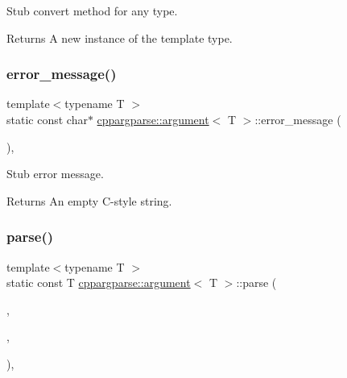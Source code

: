 Stub convert method for any type. 

\begin{DoxyReturn}{Returns}
A new instance of the template type. 
\end{DoxyReturn}
\mbox{\label{structcppargparse_1_1argument_a40c742ace10b7eeb56f2e49429f9be33}} 
\subsubsection{\texorpdfstring{error\+\_\+message()}{error\_message()}}
{\footnotesize\ttfamily template$<$typename T $>$ \\
static const char$\ast$ \hyperlink{structcppargparse_1_1argument}{cppargparse\+::argument}$<$ T $>$\+::error\+\_\+message (\begin{DoxyParamCaption}\item[{const \hyperlink{types_8h_a43b4f43f8940de1bf09ced6f1b668053}{types\+::\+Command\+Line\+Position\+\_\+t} \&}]{ }\end{DoxyParamCaption})\hspace{0.3cm}{\ttfamily [inline]}, {\ttfamily [static]}}



Stub error message. 

\begin{DoxyReturn}{Returns}
An empty C-\/style string. 
\end{DoxyReturn}
\mbox{\label{structcppargparse_1_1argument_a9b5feac6fe8cf18beb63d85c0840cd84}} 
\subsubsection{\texorpdfstring{parse()}{parse()}}
{\footnotesize\ttfamily template$<$typename T $>$ \\
static const T \hyperlink{structcppargparse_1_1argument}{cppargparse\+::argument}$<$ T $>$\+::parse (\begin{DoxyParamCaption}\item[{const \hyperlink{types_8h_a80adf2418b7ce9fe616698efa7533ecf}{types\+::\+Command\+Line\+\_\+t} \&}]{,  }\item[{const \hyperlink{types_8h_a43b4f43f8940de1bf09ced6f1b668053}{types\+::\+Command\+Line\+Position\+\_\+t} \&}]{,  }\item[{const \hyperlink{types_8h_a003c660afe2ee9c6cc39aea966e8926d}{types\+::\+Command\+Line\+Arguments\+\_\+t} \&}]{ }\end{DoxyParamCaption})\hspace{0.3cm}{\ttfamily [inline]}, {\ttfamily [static]}}



